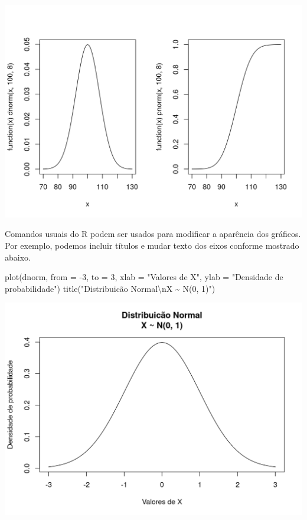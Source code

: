 \documentclass[
  10pt,
  a4paper]{book}
\newenvironment{Shaded}{\begin{snugshade}}{\end{snugshade}}
\newcommand{\AttributeTok}[1]{\textcolor[rgb]{0.77,0.63,0.00}{#1}}
\newcommand{\DecValTok}[1]{\textcolor[rgb]{0.00,0.00,0.81}{#1}}
\newcommand{\FunctionTok}[1]{\textcolor[rgb]{0.00,0.00,0.00}{#1}}
\newcommand{\NormalTok}[1]{#1}
\newcommand{\SpecialCharTok}[1]{\textcolor[rgb]{0.00,0.00,0.00}{#1}}
\newcommand{\StringTok}[1]{\textcolor[rgb]{0.31,0.60,0.02}{#1}}
\begin{document}
\begin{center}\includegraphics{figures/unnamed-chunk-344-1} \end{center}

Comandos usuais do R podem ser usados para modificar a aparência dos
gráficos. Por exemplo, podemos incluir títulos e mudar texto dos eixos
conforme mostrado abaixo.

\begin{Shaded}
\begin{Highlighting}[]
\FunctionTok{plot}\NormalTok{(dnorm, }\AttributeTok{from =} \SpecialCharTok{{-}}\DecValTok{3}\NormalTok{, }\AttributeTok{to =} \DecValTok{3}\NormalTok{,}
     \AttributeTok{xlab =} \StringTok{"Valores de X"}\NormalTok{,}
     \AttributeTok{ylab =} \StringTok{"Densidade de probabilidade"}\NormalTok{)}
\FunctionTok{title}\NormalTok{(}\StringTok{"Distribuicão Normal}\SpecialCharTok{\textbackslash{}n}\StringTok{X \textasciitilde{} N(0, 1)"}\NormalTok{)}
\end{Highlighting}
\end{Shaded}

\begin{center}\includegraphics{figures/unnamed-chunk-345-1} \end{center}
\end{document}
